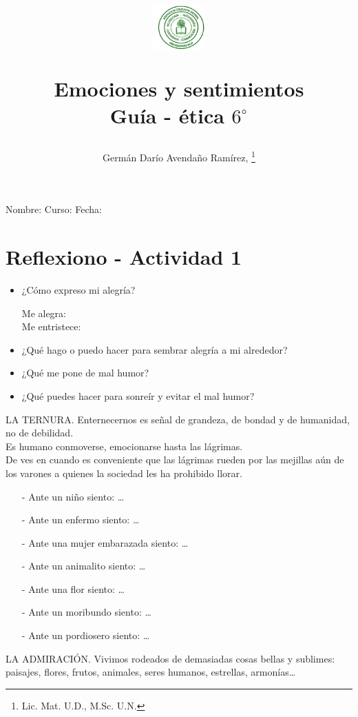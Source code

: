 \documentclass[10pt,twoside]{article}
\author{Germ\'an Dar\'io Avenda\~no Ram\'irez, \thanks{Lic. Mat. U.D., M.Sc. U.N.}}
\title{\begin{minipage}{0.15\textwidth}\includegraphics[height=1.7cm]{Images/logo-colegio.png}
\end{minipage}\hfill \begin{minipage}{0.85\textwidth}\begin{center}
Emociones y sentimientos \\Guía - ética $6^{\circ}$\end{center}
\end{minipage}}
\date{}
\begin{document}
\maketitle
Nombre: \hrulefill Curso: \underline{\hspace{1cm}}  Fecha: \underline{\hspace{2cm}}\\
\section*{Reflexiono - Actividad 1}
\begin{itemize}
  \item ¿Cómo expreso mi alegría?
\begin{multicols}{2}
  Me alegra:\\Me entristece: 
\end{multicols}
  \item ¿Qué hago o puedo hacer para sembrar alegría a mi alrededor?
  \item ¿Qué me pone de mal humor?
  \item ¿Qué puedes hacer para sonreír y evitar el mal humor?
\end{itemize}
LA TERNURA. Enternecernos es señal de grandeza, de bondad y de humanidad, no de debilidad.\\
Es humano conmoverse, emocionarse hasta las lágrimas.\\
De ves en cuando es conveniente que las lágrimas rueden por las mejillas aún de los varones a quienes la sociedad les ha prohibido llorar.
\begin{multicols}{2}
  \begin{itemize}
    \item[-] Ante un niño siento: \ldots
    \item[-] Ante un enfermo siento: \ldots
    \item[-] Ante una mujer embarazada siento: \ldots
    \item[-] Ante un animalito siento: \ldots
    \item[-] Ante una flor siento: \ldots
    \item[-] Ante un moribundo siento: \ldots
    \item[-] Ante un pordiosero siento: \ldots
  \end{itemize}
\end{multicols}
LA ADMIRACIÓN. Vivimos rodeados de demasiadas cosas bellas y sublimes: paisajes, flores, frutos, animales, seres humanos, estrellas, armonías\ldots\\
\end{document}
